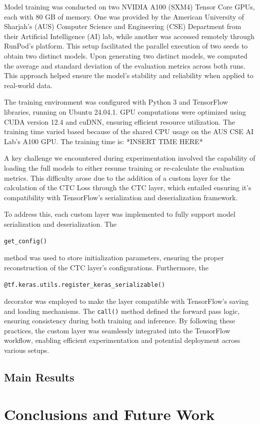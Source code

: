 \documentclass[conference]{IEEEtran}
\newcounter{customsubsubsection} %
\let\oldsubsection\subsection
\renewcommand{\subsection}[1]{%
  \oldsubsection{#1}%
  \setcounter{customsubsubsection}{0}%
}
\begin{document}
Model training was conducted on two NVIDIA A100 (SXM4) Tensor Core GPUs, each with 80 GB of memory. One was provided by the American University of Sharjah's (AUS) Computer Science and Engineering (CSE) Department from their Artificial Intelligence (AI) lab, while another was accessed remotely through RunPod's platform. This setup facilitated the parallel execution of two seeds to obtain two distinct models. Upon generating two distinct models, we computed the average and standard deviation of the evaluation metrics across both runs. This approach helped ensure the model’s stability and reliability when applied to real-world data.

The training environment was configured with Python 3 and TensorFlow libraries, running on Ubuntu 24.04.1. GPU computations were optimized using CUDA version 12.4 and cuDNN, ensuring efficient resource utilization. The training time varied based because of the shared CPU usage on the AUS CSE AI Lab's A100 GPU. The training time is: *INSERT TIME HERE*

A key challenge we encountered during experimentation involved the capability of loading the full models to either resume training or re-calculate the evaluation metrics. This difficulty arose due to the addition of a custom layer for the calculation of the CTC Loss through the CTC layer, which entailed ensuring it's compatibility with TensorFlow’s serialization and deserialization framework.

To address this, each custom layer was implemented to fully support model serialization and deserialization. The \begin{small}\texttt{get\_config()}\end{small} method was used to store initialization parameters, ensuring the proper reconstruction of the CTC layer’s configurations. Furthermore, the \begin{small}\texttt{@tf.keras.utils.register\_keras\_serializable()}\end{small} decorator was employed to make the layer compatible with TensorFlow’s saving and loading mechanisms. The \texttt{call()} method defined the forward pass logic, ensuring consistency during both training and inference. By following these practices, the custom layer was seamlessly integrated into the TensorFlow workflow, enabling efficient experimentation and potential deployment across various setups.

\subsection{Main Results}


\section{Conclusions and Future Work}

\blindtext[3]




 

\end{document}
